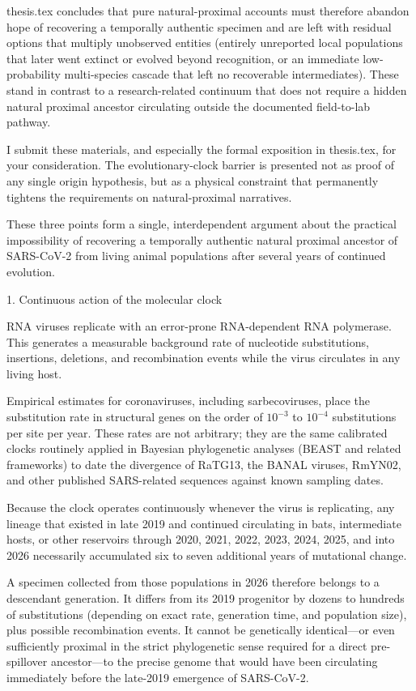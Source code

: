 thesis.tex concludes that pure natural-proximal accounts must therefore abandon hope of recovering a temporally authentic specimen and are left with residual options that multiply unobserved entities (entirely unreported local populations that later went extinct or evolved beyond recognition, or an immediate low-probability multi-species cascade that left no recoverable intermediates). These stand in contrast to a research-related continuum that does not require a hidden natural proximal ancestor circulating outside the documented field-to-lab pathway.

I submit these materials, and especially the formal exposition in thesis.tex, for your consideration. The evolutionary-clock barrier is presented not as proof of any single origin hypothesis, but as a physical constraint that permanently tightens the requirements on natural-proximal narratives.

These three points form a single, interdependent argument about the practical impossibility of recovering a temporally authentic natural proximal ancestor of SARS-CoV-2 from living animal populations after several years of continued evolution.

1. Continuous action of the molecular clock

RNA viruses replicate with an error-prone RNA-dependent RNA polymerase. This generates a measurable background rate of nucleotide substitutions, insertions, deletions, and recombination events while the virus circulates in any living host.

Empirical estimates for coronaviruses, including sarbecoviruses, place the substitution rate in structural genes on the order of \(10^{-3}\) to \(10^{-4}\) substitutions per site per year. These rates are not arbitrary; they are the same calibrated clocks routinely applied in Bayesian phylogenetic analyses (BEAST and related frameworks) to date the divergence of RaTG13, the BANAL viruses, RmYN02, and other published SARS-related sequences against known sampling dates.

Because the clock operates continuously whenever the virus is replicating, any lineage that existed in late 2019 and continued circulating in bats, intermediate hosts, or other reservoirs through 2020, 2021, 2022, 2023, 2024, 2025, and into 2026 necessarily accumulated six to seven additional years of mutational change.  

A specimen collected from those populations in 2026 therefore belongs to a descendant generation. It differs from its 2019 progenitor by dozens to hundreds of substitutions (depending on exact rate, generation time, and population size), plus possible recombination events. It cannot be genetically identical—or even sufficiently proximal in the strict phylogenetic sense required for a direct pre-spillover ancestor—to the precise genome that would have been circulating immediately before the late-2019 emergence of SARS-CoV-2.

